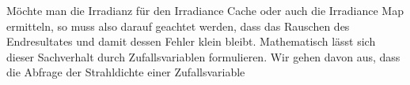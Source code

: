 		Möchte man die Irradianz für den Irradiance Cache oder auch die Irradiance Map ermitteln, so muss also darauf geachtet werden, dass das Rauschen des Endresultates und damit dessen Fehler klein bleibt.
		Mathematisch lässt sich dieser Sachverhalt durch Zufallsvariablen formulieren.
		Wir gehen davon aus, dass die Abfrage der Strahldichte einer Zufallsvariable


